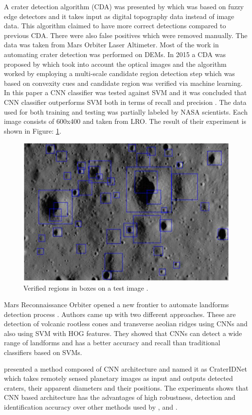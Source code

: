 \documentclass[11pt]{article}
\begin{document}
A crater detection algorithm (CDA) was presented by \cite{salamuniccar2010method} which was based on fuzzy edge detectors and it takes input as digital topography data instead of image data. This algorithm claimed to have more correct detections compared to previous CDA. There were also false positives which were removed manually. The data was taken from Mars Orbiter Laser Altimeter. Most of the work in automating crater detection was performed on DEMs. In 2015 a CDA was proposed by \cite{emami2015automatic} which took into account the optical images and the algorithm worked by employing a multi-scale candidate region detection step which was based on convexity cues and candidate region was verified via machine learning. In this paper a CNN classifier was tested against SVM and it was concluded that CNN classifier outperforms SVM both in terms of recall and precision \cite{emami2015automatic}. The data used for both training and testing was partially labeled by NASA scientists. Each image consists of 600x400 and taken from LRO. The result of their experiment is shown in Figure: \ref{cnn_class}.

\begin{figure}[ht!]
	\centering
	\includegraphics[width=.6\textwidth]{files/literature/emami.png}
	\caption{Verified regions in boxes on a test image \cite{wetzler2005learning}.}
	\label{cnn_class}
\end{figure}

Mars Reconnaissance Orbiter opened a new frontier to automate landforms detection process \cite{palafox2017automated}. Authors came up with two different approaches. These are detection of volcanic rootless cones and transverse aeolian ridges using CNNs and also using SVM with HOG features. They showed that CNNs can detect a wide range of landforms and has a better accuracy and recall than traditional classifiers based on SVMs.

\cite{wang2018crateridnet} presented a method composed of CNN architecture and named it as CraterIDNet which takes remotely sensed planetary images as input and outputs detected craters, their apparent diameters and their positions. The experiments shows that CNN based architecture has the advantages of high robustness, detection and identification accuracy over other methods used by \cite{urbach2009automatic}, \cite{bandeira2010automatic} and \cite{ding2011subkilometer}.
\end{document}
